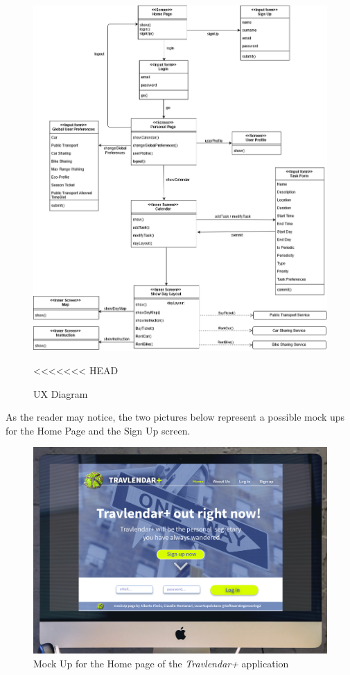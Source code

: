 \begin{figure}[H]
    \centering
    \includegraphics[scale=0.4]{Pictures/UXDiagram/UXDiagram.png}
    \caption{UX Diagram}
<<<<<<< HEAD
\end{figure}

As the reader may notice, the two pictures below represent a possible mock ups for the Home Page and the Sign Up screen.

\begin{figure}[H]
    \centering
    \includegraphics[scale=0.2]{Pictures/UXDiagram/desktopMockUpHome.png}
    \caption{Mock Up for the Home page of the \emph{Travlendar+} application}
    \label{fig:homePageMockUp}
\end{figure}

